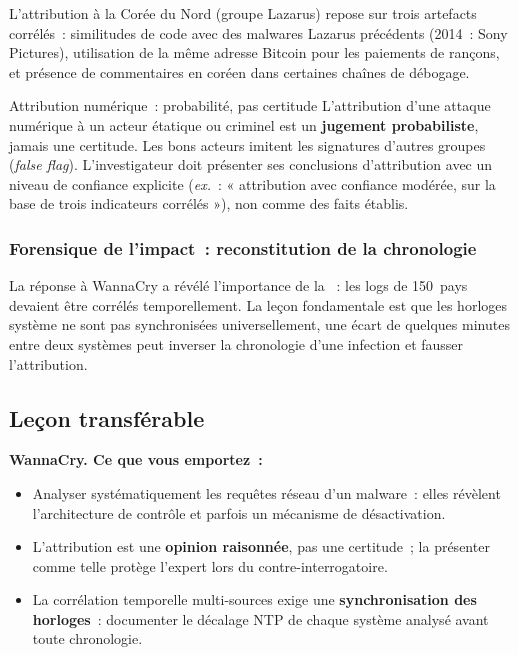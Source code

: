 L'attribution à la Corée du Nord (groupe Lazarus) repose sur trois
artefacts corrélés~: similitudes de code avec des malwares Lazarus
précédents (2014~: Sony Pictures), utilisation de la même adresse
Bitcoin pour les paiements de rançons, et présence de commentaires
en coréen dans certaines chaînes de débogage.

\begin{boiteRemarque}{Attribution numérique~: probabilité, pas certitude}
L'attribution d'une attaque numérique à un acteur étatique ou
criminel est un \textbf{jugement probabiliste}, jamais une certitude.
Les bons acteurs imitent les signatures d'autres groupes (\textit{false
flag}). L'investigateur doit présenter ses conclusions d'attribution avec
un niveau de confiance explicite (\textit{ex.}~: « attribution avec
confiance modérée, sur la base de trois indicateurs corrélés »), non
comme des faits établis.
\end{boiteRemarque}

\subsubsection{Forensique de l'impact~: reconstitution de la chronologie}

La réponse à WannaCry a révélé l'importance de la
~:
les logs de 150~pays devaient être corrélés temporellement. La
leçon fondamentale est que les horloges système ne sont pas synchronisées
universellement, une écart de quelques minutes entre deux systèmes
peut inverser la chronologie d'une infection et fausser l'attribution.

\subsection{Leçon transférable}

\begin{boxresume}
\textbf{WannaCry. Ce que vous emportez~:}
\begin{itemize}
    \item Analyser systématiquement les requêtes réseau d'un malware~:
          elles révèlent l'architecture de contrôle et parfois un
          mécanisme de désactivation.
    \item L'attribution est une \textbf{opinion raisonnée}, pas une
          certitude~; la présenter comme telle protège l'expert
          lors du contre-interrogatoire.
    \item La corrélation temporelle multi-sources exige une
          \textbf{synchronisation des horloges}~: documenter le
          décalage NTP de chaque système analysé avant toute chronologie.
\end{itemize}
\end{boxresume}

